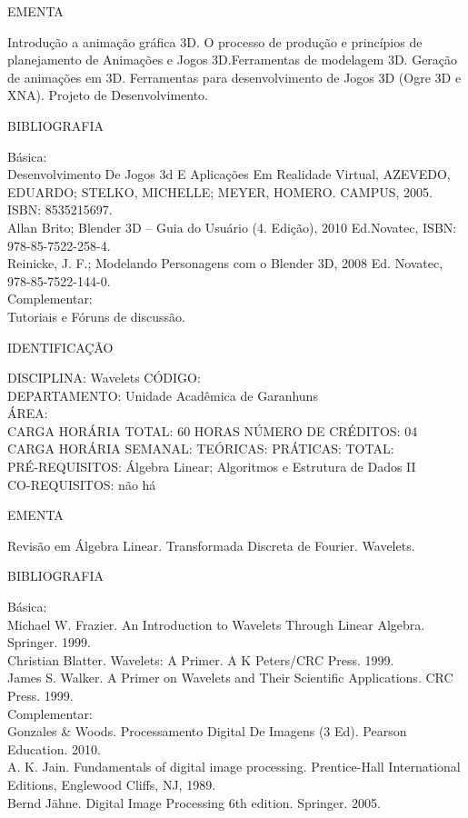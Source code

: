 \documentclass[
	12pt,				%
	openright,			%
  oneside,     %
	a4paper,			%
	chapter=TITLE,		%
	english,			%
	french,				%
	spanish,			%
	brazil				%
	]{abntex2}
\begin{document}
\begin{apendicesenv}
EMENTA 

Introdução a animação gráfica 3D. O processo de produção e princípios de
planejamento de Animações e Jogos 3D.Ferramentas de modelagem 3D.
Geração de animações em 3D. Ferramentas para desenvolvimento de Jogos
3D (Ogre 3D e XNA). Projeto de Desenvolvimento.

BIBLIOGRAFIA 

Básica:\\
Desenvolvimento De Jogos 3d E Aplicações Em Realidade Virtual, AZEVEDO,
EDUARDO; STELKO, MICHELLE; MEYER, HOMERO. CAMPUS, 2005. ISBN:
8535215697.\\
Allan Brito; Blender 3D -- Guia do Usuário (4. Edição), 2010 Ed.Novatec,
ISBN: 978-85-7522-258-4.\\
Reinicke, J. F.; Modelando Personagens com o Blender 3D, 2008 Ed.
Novatec, 978-85-7522-144-0. \\
Complementar:\\
Tutoriais e Fóruns de discussão.

\newpage IDENTIFICAÇÃO

DISCIPLINA: Wavelets CÓDIGO:\\ 
DEPARTAMENTO: Unidade Acadêmica de Garanhuns\\ ÁREA: \\
CARGA HORÁRIA TOTAL: 60 HORAS NÚMERO DE CRÉDITOS: 04\\
CARGA HORÁRIA SEMANAL: TEÓRICAS: PRÁTICAS: TOTAL: \\
PRÉ-REQUISITOS: Álgebra Linear; Algoritmos e Estrutura de Dados II
\\CO-REQUISITOS: não há

EMENTA 

Revisão em Álgebra Linear. Transformada Discreta de Fourier. Wavelets.

BIBLIOGRAFIA 

Básica:\\
Michael W. Frazier. An Introduction to Wavelets Through Linear Algebra.
Springer. 1999.\\
Christian Blatter. Wavelets: A Primer. A K Peters/CRC Press. 1999.\\
James S. Walker. A Primer on Wavelets and Their Scientific Applications.
CRC Press. 1999.\\
Complementar:\\
Gonzales \& Woods. Processamento Digital De Imagens (3 Ed). Pearson
Education. 2010. \\
A. K. Jain. Fundamentals of digital image processing. Prentice-Hall
International Editions, Englewood Cliffs, NJ, 1989.\\
Bernd Jähne. Digital Image Processing 6th edition. Springer. 2005.


\end{apendicesenv}
\end{document}
